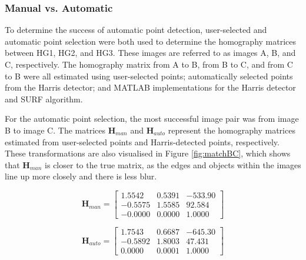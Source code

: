 \documentclass[a4paper, 10pt, conference]{ieeeconf}
\begin{document}
\subsubsection{Manual vs. Automatic}
To determine the success of automatic point detection, user-selected and automatic point selection were both used to determine the homography matrices between HG1, HG2, and HG3. These images are referred to as images A, B, and C, respectively. The homography matrix from A to B, from B to C, and from C to B were all estimated using user-selected points; automatically selected points from the Harris detector; and MATLAB implementations for the Harris detector and SURF algorithm.


For the automatic point selection, the most successful image pair was from image B to image C. The matrices $\textbf{H}_{man}$ and $\textbf{H}_{auto}$ represent the homography matrices estimated from user-selected points and Harris-detected points, respectively. These transformations are also visualised in Figure \ref{fig:matchBC}, which shows that $\textbf{H}_{man}$ is closer to the true matrix, as the edges and objects within the images line up more closely and there is less blur.


\begin{equation} \label{eqn:manHomog}
\textbf{H}_{man} = \begin{bmatrix}
     1.5542 &  0.5391 & -533.90 \\
    -0.5575 &  1.5585 &  92.584 \\
    -0.0000 &  0.0000 &  1.0000
\end{bmatrix}
\end{equation}

\begin{equation} \label{eqn:autoHomog}
\textbf{H}_{auto} = \begin{bmatrix}
     1.7543 &  0.6687 & -645.30 \\
    -0.5892 &  1.8003 &  47.431 \\
     0.0000 &  0.0001 &  1.0000
\end{bmatrix}
\end{equation}
\end{document}
